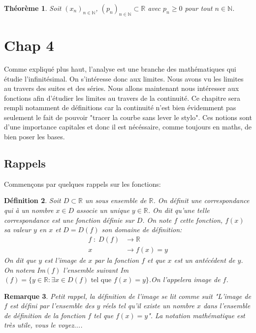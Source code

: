 \documentclass[a4paper, 12pt, french, twoside]{article}
\newtheorem{theorem}{Théorème}[section]
\newtheorem{defi}[theorem]{Définition}
\newtheorem{rem}[theorem]{Remarque}
\newcommand{\Nn}{{\mathbb{N}}}
\newcommand{\Rr}{{\mathbb{R}}}
\begin{document}
\begin{theorem}
    Soit $(x_n)_{n\in\Nn}$, $(p_n)_{n\in\Nn}\subset\Rr$ avec $p_n\geq0$ pour tout $n\in\Nn$.
\end{theorem}
\section{Chap 4}
Comme expliqué plus haut, l'analyse est une branche des mathématiques qui étudie l'infinitésimal. On s'intéresse donc aux limites. Nous avons vu les limites au travers des suites et des séries. Nous allons maintenant nous intéresser aux fonctions afin d'étudier les limites au travers de la continuité. Ce chapitre sera rempli notamment de définitions car la continuité n'est bien évidemment pas seulement le fait de pouvoir "tracer la courbe sans lever le stylo". Ces notions sont d'une importance capitales et donc il est nécéssaire, comme toujours en maths, de bien poser les bases.

\subsection{Rappels}
Commençons par quelques rappels sur les fonctions: 
\begin{defi}
    Soit $D\subset \Rr$ un sous ensemble de $\Rr$. On définit une correspondance qui à un nombre $x\in D$ associe un unique $y\in \Rr$. On dit qu'une telle correspondance est une fonction définie sur $D$. On note $f$ cette fonction, $f(x)$ sa valeur $y$ en $x$ et $D=D(f)$ son domaine de définition: 
    \begin{align*}
        f\; : \; D(f)&\longrightarrow \Rr\\
        x\; &\longrightarrow f(x)=y
    \end{align*}
  On dit que $y$ est l'image de $x$ par la fonction $f$ et que $x$ est un antécédent de $y$. On notera Im$(f)$ l'ensemble suivant Im$(f)=\{y\in \Rr : \exists x \in D(f) \text{ tel que } f(x)=y\}$.On l'appelera image de $f$.

\end{defi}
\begin{rem}
 Petit rappel, la définition de l'image se lit comme suit "L'image de $f$ est défini par l'ensemble des $y$ réels tel qu'il existe un nombre $x$ dans l'ensemble de définition de la fonction $f$ tel que $f(x)=y$". La notation mathématique est très utile, vous le voyez....     
\end{rem}
 
\end{document}
